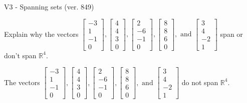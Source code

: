 \begin{exercise}
  \begin{exerciseTitle}V3 - Spanning sets (ver. 849)\end{exerciseTitle}
  \begin{exerciseStatement}
    Explain why the vectors \(\left[\begin{array}{r}
-3 \\
1 \\
-1 \\
0
\end{array}\right] , \left[\begin{array}{r}
4 \\
4 \\
3 \\
0
\end{array}\right] , \left[\begin{array}{r}
2 \\
-6 \\
-1 \\
0
\end{array}\right] , \left[\begin{array}{r}
8 \\
8 \\
6 \\
0
\end{array}\right] , \text{ and } \left[\begin{array}{r}
3 \\
4 \\
-2 \\
1
\end{array}\right]\) span or don't span \(\mathbb{R}^4\). 
	


  \end{exerciseStatement}
  \begin{exerciseAnswer}
   The vectors \(\left[\begin{array}{r}
-3 \\
1 \\
-1 \\
0
\end{array}\right] , \left[\begin{array}{r}
4 \\
4 \\
3 \\
0
\end{array}\right] , \left[\begin{array}{r}
2 \\
-6 \\
-1 \\
0
\end{array}\right] , \left[\begin{array}{r}
8 \\
8 \\
6 \\
0
\end{array}\right] , \text{ and } \left[\begin{array}{r}
3 \\
4 \\
-2 \\
1
\end{array}\right]\) 
  	 do not  
	span \(\mathbb{R}^4\).
  


  \end{exerciseAnswer}
\end{exercise}